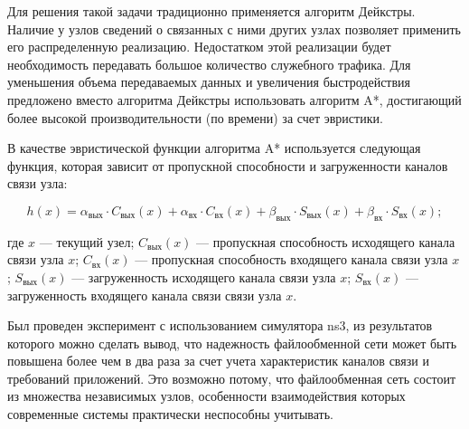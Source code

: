\documentclass[10pt, a5paper]{article}
\begin{document}
Для решения такой задачи традиционно применяется алгоритм Дейкстры. Наличие у узлов сведений о связанных с ними других узлах позволяет применить его распределенную реализацию. Недостатком этой реализации будет необходимость передавать большое количество служебного трафика. Для уменьшения объема передаваемых данных и увеличения быстродействия предложено вместо алгоритма Дейкстры использовать алгоритм A*, достигающий более высокой производительности (по времени) за счет эвристики.

В качестве эвристической функции алгоритма A* используется следующая функция, которая зависит от пропускной способности и загруженности каналов связи узла:

$$ h(x) = \alpha_{\text{вых}} \cdot C_{\text{вых}}(x) + \alpha_{\text{вх}} \cdot C_{\text{вх}}(x) + \beta_{\text{вых}} \cdot S_{\text{вых}}(x)+ \beta_{\text{вх}} \cdot S_{\text{вх}}(x); $$

\noindent где $x$ --- текущий узел;
$C_{\text{вых}}(x)$ --- пропускная способность  исходящего  канала связи  узла $x$;
$C_{\text{вх}}(x)$ --- пропускная способность   входящего  канала связи  узла $x$;
$S_{\text{вых}}(x)$ --- загруженность исходящего  канала связи  узла $x$;
$S_{\text{вх}}(x)$ --- загруженность входящего  канала связи  связи  узла $x$.

Был проведен эксперимент с использованием симулятора ns3, из результатов которого можно сделать вывод, что надежность файлообменной сети может быть повышена более чем в два раза за счет учета характеристик каналов связи и требований приложений. Это возможно потому, что файлообменная сеть состоит из множества независимых узлов, особенности взаимодействия которых современные системы практически неспособны учитывать. 
\end{document}
